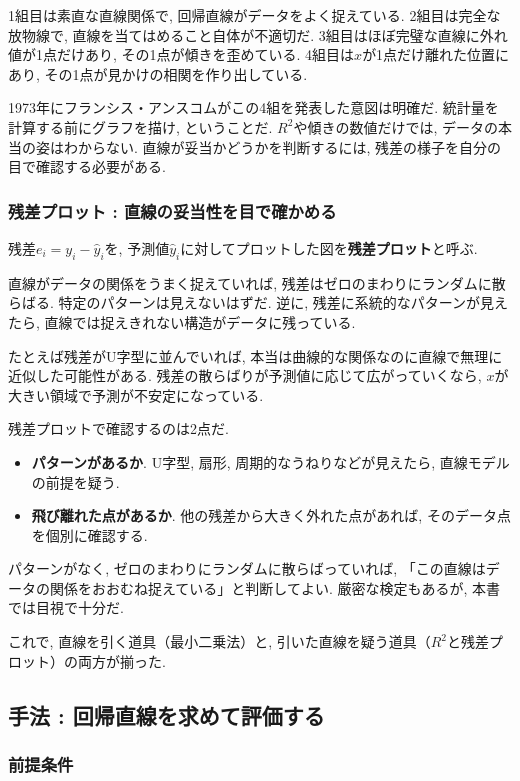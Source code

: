 1組目は素直な直線関係で, 回帰直線がデータをよく捉えている.
2組目は完全な放物線で, 直線を当てはめること自体が不適切だ.
3組目はほぼ完璧な直線に外れ値が1点だけあり, その1点が傾きを歪めている.
4組目は$x$が1点だけ離れた位置にあり, その1点が見かけの相関を作り出している.

1973年にフランシス・アンスコムがこの4組を発表した意図は明確だ.
統計量を計算する前にグラフを描け, ということだ.
$R^2$や傾きの数値だけでは, データの本当の姿はわからない.
直線が妥当かどうかを判断するには, 残差の様子を自分の目で確認する必要がある.

\subsubsection*{残差プロット : 直線の妥当性を目で確かめる}

残差$e_i = y_i - \hat{y}_i$を, 予測値$\hat{y}_i$に対してプロットした図を\textbf{残差プロット}と呼ぶ.

直線がデータの関係をうまく捉えていれば, 残差はゼロのまわりにランダムに散らばる.
特定のパターンは見えないはずだ.
逆に, 残差に系統的なパターンが見えたら, 直線では捉えきれない構造がデータに残っている.

たとえば残差がU字型に並んでいれば, 本当は曲線的な関係なのに直線で無理に近似した可能性がある.
残差の散らばりが予測値に応じて広がっていくなら, $x$が大きい領域で予測が不安定になっている.

残差プロットで確認するのは2点だ.

\begin{itemize}
  \item \textbf{パターンがあるか}. U字型, 扇形, 周期的なうねりなどが見えたら, 直線モデルの前提を疑う.
  \item \textbf{飛び離れた点があるか}. 他の残差から大きく外れた点があれば, そのデータ点を個別に確認する.
\end{itemize}

パターンがなく, ゼロのまわりにランダムに散らばっていれば, 「この直線はデータの関係をおおむね捉えている」と判断してよい.
厳密な検定もあるが, 本書では目視で十分だ.

これで, 直線を引く道具（最小二乗法）と, 引いた直線を疑う道具（$R^2$と残差プロット）の両方が揃った.


\subsection{手法 : 回帰直線を求めて評価する}

\subsubsection*{前提条件}

